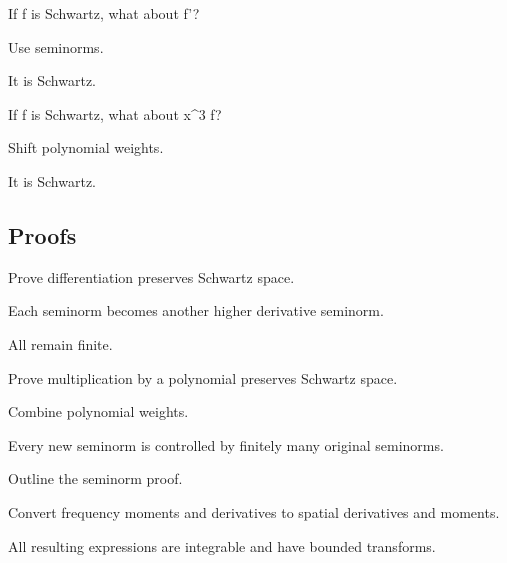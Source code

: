\begin{exercise}\label{exr:iii14-expand-04}
If f is Schwartz, what about f'?
\end{exercise}
\begin{hint}
Use seminorms.
\end{hint}
\begin{solution}
It is Schwartz.
\end{solution}

\begin{exercise}\label{exr:iii14-expand-05}
If f is Schwartz, what about x\textasciicircum{}3 f?
\end{exercise}
\begin{hint}
Shift polynomial weights.
\end{hint}
\begin{solution}
It is Schwartz.
\end{solution}

\subsection*{Proofs}

\begin{exercise}\label{exr:iii14-expand-06}
Prove differentiation preserves Schwartz space.
\end{exercise}
\begin{hint}
Each seminorm becomes another higher derivative seminorm.
\end{hint}
\begin{solution}
All remain finite.
\end{solution}

\begin{exercise}\label{exr:iii14-expand-07}
Prove multiplication by a polynomial preserves Schwartz space.
\end{exercise}
\begin{hint}
Combine polynomial weights.
\end{hint}
\begin{solution}
Every new seminorm is controlled by finitely many original seminorms.
\end{solution}

\begin{exercise}\label{exr:iii14-expand-08}
Outline the seminorm proof.
\end{exercise}
\begin{hint}
Convert frequency moments and derivatives to spatial derivatives and moments.
\end{hint}
\begin{solution}
All resulting expressions are integrable and have bounded transforms.
\end{solution}

